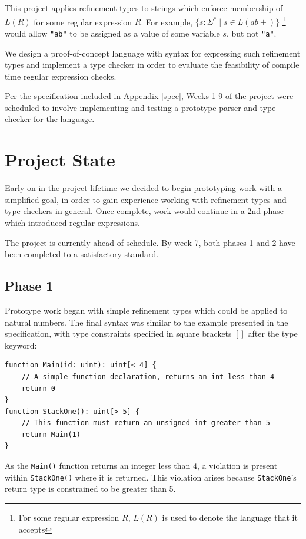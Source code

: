 \documentclass[a4paper]{article}
\begin{document}
    This project applies refinement types to strings which enforce membership of $L(R)$ for some regular expression $R$. For example, $\{s: \Sigma^* \mid s \in L(ab+)\}$ \footnote{For some regular expression $R$, $L(R)$ is used to denote the language that it accepts} would allow \texttt{"ab"} to be assigned as a value of some variable $s$, but not \texttt{"a"}.
    
    We design a proof-of-concept language with syntax for expressing such refinement types and implement a type checker in order to evaluate the feasibility of compile time regular expression checks.

    Per the specification included in Appendix \ref{spec}, Weeks 1-9 of the project were scheduled to involve implementing and testing a prototype parser and type checker for the language.
    
    \section{Project State}
    
    Early on in the project lifetime we decided to begin prototyping work with a simplified goal, in order to gain experience working with refinement types and type checkers in general. Once complete, work would continue in a 2nd phase which introduced regular expressions.
    
    The project is currently ahead of schedule. By week 7, both phases 1 and 2 have been completed to a satisfactory standard.
    
    \subsection*{Phase 1}\hfill
    
    Prototype work began with simple refinement types which could be applied to natural numbers. The final syntax was similar to the example presented in the specification, with type constraints specified in square brackets $[ ]$ after the type keyword:
    
    \begin{verbatim}
function Main(id: uint): uint[< 4] {
    // A simple function declaration, returns an int less than 4
    return 0
}
function StackOne(): uint[> 5] {
    // This function must return an unsigned int greater than 5
    return Main(1)
}
    \end{verbatim}
    
    As the \texttt{Main()} function returns an integer less than 4, a violation is present within \texttt{StackOne()} where it is returned. This violation arises because \texttt{StackOne}'s return type is constrained to be greater than 5.
    
\end{document}
